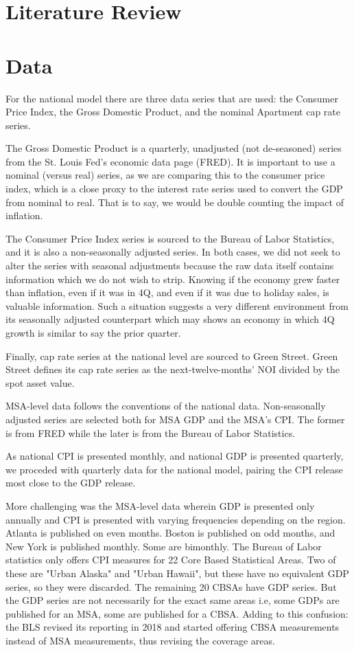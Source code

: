 \section{Literature Review}


\section{Data}
For the national model there are three data series that are used: the Consumer Price Index, the Gross Domestic Product, and the nominal Apartment cap rate series. 

The Gross Domestic Product is a quarterly, unadjusted (not de-seasoned) series from the St. Louis Fed's economic data page (FRED). It is important to use a nominal (versus real) series, as we are comparing this to the consumer price index, which is a close proxy to the interest rate series used to convert the GDP from nominal to real. That is to say, we would be double counting the impact of inflation.

The Consumer Price Index series is sourced to the Bureau of Labor Statistics, and it is also a non-seasonally adjusted series. In both cases, we did not seek to alter the series with seasonal adjustments because the raw data itself contains information which we do not wish to strip. Knowing if the economy grew faster than inflation, even if it was in 4Q, and even if it was due to holiday sales, is valuable information. Such a situation suggests a very different environment from its seasonally adjusted counterpart which may shows an economy in which 4Q growth is similar to say the prior quarter.

Finally, cap rate series at the national level are sourced to Green Street. Green Street defines its cap rate series as the next-twelve-months' NOI divided by the spot asset value. 

MSA-level data follows the conventions of the national data. Non-seasonally adjusted series are selected both for MSA GDP and the MSA's CPI. The former is from FRED while the later is from the Bureau of Labor Statistics.

As national CPI is presented monthly, and national GDP is presented quarterly, we proceded with quarterly data for the national model, pairing the CPI release most close to the GDP release. 

More challenging was the MSA-level data wherein GDP is presented only annually and CPI is presented with varying frequencies depending on the region. Atlanta is published on even months. Boston is published on odd months, and New York is published monthly. Some are bimonthly. The Bureau of Labor statistics only offers CPI measures for 22 Core Based Statistical Areas. Two of these are "Urban Alaska" and "Urban Hawaii", but these have no equivalent GDP series, so they were discarded. The remaining 20 CBSAs have GDP series. But the GDP series are not necessarily for the exact same areas i.e, some GDPs are published for an MSA, some are published for a CBSA. Adding to this confusion: the BLS revised its reporting in 2018 and started offering CBSA measurements instead of MSA measurements, thus revising the coverage areas.

